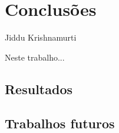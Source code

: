 
\chapter{Conclusões}
\label{cap:4:conclusoes}

{Jiddu Krishnamurti}

Neste trabalho...

\section{Resultados}
\label{sec:4:resultados}

\section{Trabalhos futuros}
\label{sec:4:trabalhosfuturos}


